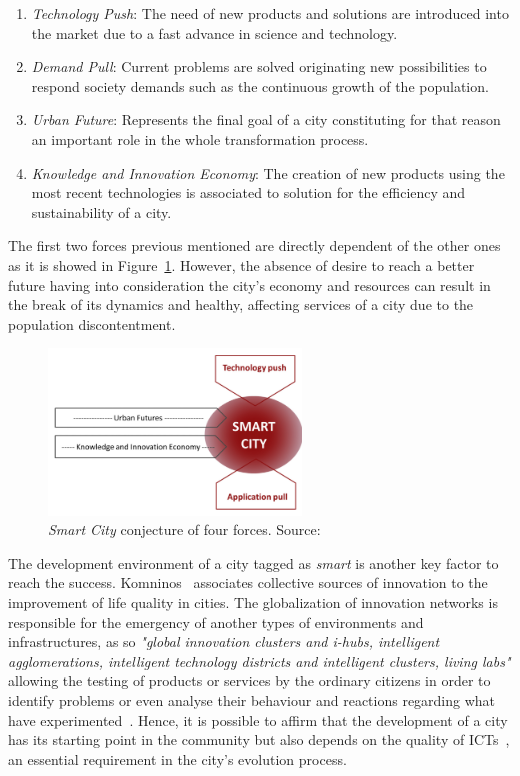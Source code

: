 \begin{enumerate}
	\item \textit{Technology Push}: The need of new products and solutions are introduced into the market due to a fast advance in science and technology.
	\item \textit{Demand Pull}: Current problems are solved originating new possibilities to respond society demands such as the continuous growth of the population.
	\item \textit{Urban Future}: Represents the final goal of a city constituting for that reason an important role in the whole transformation process.
	\item \textit{Knowledge and Innovation Economy}: The creation of new products using the most recent technologies is associated to solution for the efficiency and sustainability of a city.
\end{enumerate}

The first two forces previous mentioned are directly dependent of the other ones as it is showed in Figure~\ref{fig:four_forces}. However, the absence of desire to reach a better future having into consideration the city's economy and resources can result in the break of its dynamics and healthy, affecting services of a city due to the population discontentment.

\begin{figure}
	\centering
	\includegraphics[width=0.6\textwidth]{figures/four_forces.png}
	\caption{\textit{Smart City} conjecture of four forces. Source:~\cite{kn:Angelidou2015}}
	\label{fig:four_forces}
\end{figure}

The development environment of a city tagged as \textit{smart} is another key factor to reach the success. Komninos~\cite{kn:Komninos2009} associates collective sources of innovation to the improvement of life quality in cities. The globalization of innovation networks is responsible for the emergency of another types of environments and infrastructures, as so \emph{"global innovation clusters and i-hubs, intelligent agglomerations, intelligent technology districts and intelligent clusters, living labs"} allowing the testing of products or services by the ordinary citizens in order to identify problems or even analyse their behaviour  and reactions regarding what have experimented~\cite{kn:Komninos2009}. Hence, it is possible to affirm that the development of a city has its starting point in the community but also depends on the quality of \glspl{ICT}~\cite{hollands2008will}, an essential requirement in the city's evolution process.

